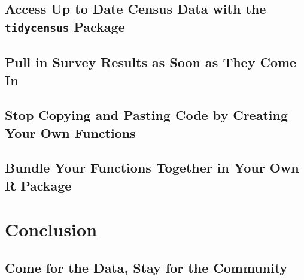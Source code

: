 \documentclass[
]{book}
\begin{document}
\hypertarget{access-up-to-date-census-data-with-the-tidycensus-package}{%
\chapter*{\texorpdfstring{Access Up to Date Census Data with the \texttt{tidycensus} Package}{Access Up to Date Census Data with the tidycensus Package}}\label{access-up-to-date-census-data-with-the-tidycensus-package}}

\hypertarget{pull-in-survey-results-as-soon-as-they-come-in}{%
\chapter*{Pull in Survey Results as Soon as They Come In}\label{pull-in-survey-results-as-soon-as-they-come-in}}

\hypertarget{stop-copying-and-pasting-code-by-creating-your-own-functions}{%
\chapter*{Stop Copying and Pasting Code by Creating Your Own Functions}\label{stop-copying-and-pasting-code-by-creating-your-own-functions}}

\hypertarget{bundle-your-functions-together-in-your-own-r-package}{%
\chapter*{Bundle Your Functions Together in Your Own R Package}\label{bundle-your-functions-together-in-your-own-r-package}}

\hypertarget{part-conclusion}{%
\part*{Conclusion}\label{part-conclusion}}

\hypertarget{come-for-the-data-stay-for-the-community}{%
\chapter*{Come for the Data, Stay for the Community}\label{come-for-the-data-stay-for-the-community}}
\end{document}
